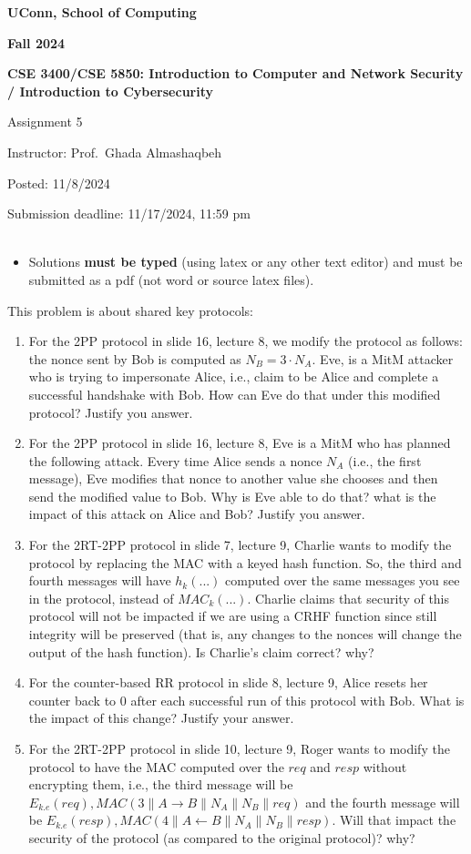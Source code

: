 \documentclass[12pt]{article}
\newcommand*\concat{\mathbin{\|}}
\newcommand{\handout}[2]{
\renewcommand{\thepage}{\footnotesize CSE 3400/CSE 5850, #1, p. \arabic{page}}
\begin{center}

\noindent
{\bf UConn, School of Computing}

\noindent
{\bf Fall 2024}

\noindent
{\bf CSE 3400/CSE 5850: Introduction to Computer and Network Security \\ / Introduction to Cybersecurity}
\end{center}

\begin{center}
{\Large #1}
\end{center}
}
\begin{document}
\handout{Assignment 5}{}

\noindent
{Instructor: Prof.~Ghada Almashaqbeh}

\noindent
{Posted: 11/8/2024}

\noindent
{Submission deadline: 11/17/2024, 11:59 pm} \\\\

\begin{itemize}
\item Solutions {\bf must be typed} (using latex or any other text editor) and must be submitted as a pdf (not word or source latex files).
\end{itemize}

This problem is about shared key protocols:
\begin{enumerate}
    \item For the 2PP protocol in slide 16, lecture 8, we modify the protocol as follows: the nonce sent by Bob is computed as $N_B = 3 \cdot N_A$. Eve, is a MitM attacker who is trying to impersonate Alice, i.e., claim to be Alice and complete a successful handshake with Bob. How can Eve do that under this modified protocol? Justify you answer.

    \item For the 2PP protocol in slide 16, lecture 8, Eve is a MitM who has planned the following attack. Every time Alice sends a nonce $N_A$ (i.e., the first message), Eve modifies that nonce to another value she chooses and then send the modified value to Bob. Why is Eve able to do that? what is the impact of this attack on Alice and Bob? Justify you answer.
    
    \item For the 2RT-2PP protocol in slide 7, lecture 9, Charlie wants to modify the protocol by replacing the MAC with a keyed hash function. So, the third and fourth messages will have $h_k(...)$ computed over the same messages you see in the protocol, instead of $MAC_k(...)$. Charlie claims that security of this protocol will not be impacted if we are using a CRHF function since still integrity will be preserved (that is, any changes to the nonces will change the output of the hash function). Is Charlie's claim correct? why?
    
    \item For the counter-based RR protocol in slide 8, lecture 9, Alice resets her counter back to 0 after each successful run of this protocol with Bob. What is the impact of this change? Justify your answer. 


    \item For the 2RT-2PP protocol in slide 10, lecture 9, Roger wants to modify the protocol to have the MAC computed over the $req$ and $resp$ without encrypting them, i.e., the third message will be $E_{k.e} (req), MAC(3 \concat A\rightarrow B \concat  N_A \concat N_B \concat req)$ and the fourth message will be $E_{k.e} (resp), MAC(4 \concat A\leftarrow B \concat  N_A \concat N_B \concat resp)$. Will that impact the security of the protocol (as compared to the original protocol)? why? 
\end{enumerate}
\end{document}
